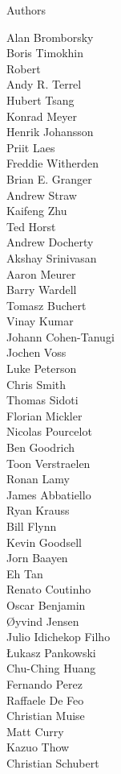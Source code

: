 \begin{frame}{Authors}
\begin{multicols}{5}
Alan Bromborsky\\
Boris Timokhin\\
Robert\\
Andy R. Terrel\\
Hubert Tsang\\
Konrad Meyer\\
Henrik Johansson\\
Priit Laes\\
Freddie Witherden\\
Brian E. Granger\\
Andrew Straw\\
Kaifeng Zhu\\
Ted Horst\\
Andrew Docherty\\
Akshay Srinivasan\\
Aaron Meurer\\
Barry Wardell\\
Tomasz Buchert\\
Vinay Kumar\\
Johann Cohen-Tanugi\\
Jochen Voss\\
Luke Peterson\\
Chris Smith\\
Thomas Sidoti\\
Florian Mickler\\
Nicolas Pourcelot\\
Ben Goodrich\\
Toon Verstraelen\\
Ronan Lamy\\
James Abbatiello\\
Ryan Krauss\\
Bill Flynn\\
Kevin Goodsell\\
Jorn Baayen\\
Eh Tan\\
Renato Coutinho\\
Oscar Benjamin\\
Øyvind Jensen\\
Julio Idichekop Filho\\
Łukasz Pankowski\\
Chu-Ching Huang\\
Fernando Perez\\
Raffaele De Feo\\
Christian Muise\\
Matt Curry\\
Kazuo Thow\\
Christian Schubert\\

\end{multicols}
\end{frame}
